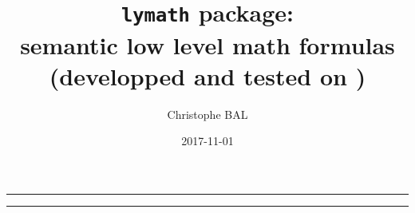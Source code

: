 \documentclass[12pt,a4paper]{article}
\begin{document}
\title{\texttt{lymath} package:\\semantic low level math formulas\\{\footnotesize (developped and tested on \macosxname{})}}
\author{Christophe BAL}
\date{2017-11-01}

\maketitle


\vspace{2em}

\hrule

\tableofcontents

\vspace{1.5em}

\hrule

\newpage

\end{document}
